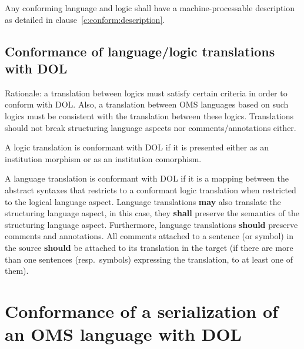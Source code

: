 \documentclass[10pt,%
\ifpretendfinal
final%
\else
draft%
\fi,
]{scrreprt}
\newcommand*{\shall}{\textbf{shall}\xspace}
\newcommand*{\should}{\textbf{should}\xspace}
\newcommand*{\may}{\textbf{may}\xspace}
\newcommand{\clauserefname}{clause}
\newcommand{\cref}[1]{\clauserefname~\ref{#1}}
\newcommand{\sclause}[1]{\section{#1}}
\newcommand{\ssclause}[1]{\subsection{#1}}
\begin{document}
Any conforming language and logic shall have a machine-processable description
 as detailed in \cref{c:conform:description}.

\ssclause{Conformance of language/logic translations with DOL}

Rationale: a translation between logics must satisfy certain criteria in order to conform with DOL.  Also, a translation between OMS languages based on such logics must be consistent with the translation between these logics.  Translations should not break structuring language aspects nor comments/annotations either.

A logic translation is conformant with DOL if it is presented
either as an institution morphism or as an institution comorphism.  

A language translation is conformant with DOL if it is a mapping
between the abstract syntaxes that restricts to a conformant logic
translation when restricted to the logical language aspect. Language
translations \may also translate the structuring language aspect, in
this case, they \shall preserve the semantics of the structuring
language aspect.  Furthermore, language translations \should preserve
comments and annotations.  All comments attached to a sentence (or
symbol) in the source \should be attached to its translation in the
target (if there are more than one sentences (resp.\ symbols)
expressing the translation, to at least one of them).


\sclause{Conformance of a serialization of an OMS language with DOL}\label{c:conform:serialization}
\end{document}
